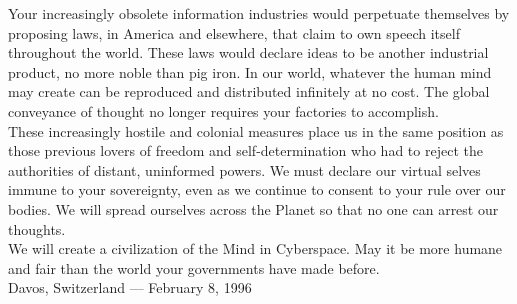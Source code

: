 \documentclass[11pt,twoside,a4paper]{book}
\begin{document}
\begin{center}
\begin{minipage}[ht]{0.95\textwidth}
	Your increasingly obsolete information industries would perpetuate themselves by proposing laws, in America and elsewhere, that claim to own speech itself throughout the world. These laws would declare ideas to be another industrial product, no more noble than pig iron. In our world, whatever the human mind may create can be reproduced and distributed infinitely at no cost. The global conveyance of thought no longer requires your factories to accomplish. ~\\
	
	These increasingly hostile and colonial measures place us in the same position as those previous lovers of freedom and self-determination who had to reject the authorities of distant, uninformed powers. We must declare our virtual selves immune to your sovereignty, even as we continue to consent to your rule over our bodies. We will spread ourselves across the Planet so that no one can arrest our thoughts. ~\\
	
	We will create a civilization of the Mind in Cyberspace. May it be more humane and fair than the world your governments have made before. ~\\
	
	Davos, Switzerland --- February 8, 1996 ~\\
\end{minipage} \end{center}

\end{document}
